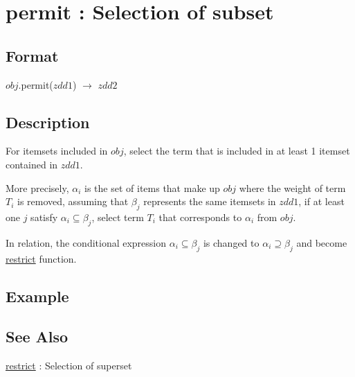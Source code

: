 
\section{permit : Selection of subset\label{sect:permit}}
\subsection*{Format}
$obj$.permit($zdd1$) $\rightarrow$ $zdd2$

\subsection*{Description}
For itemsets included in $obj$, select the term that is included in at least 1 itemset contained in $zdd1$. 

More precisely, $\alpha_i$ is the set of items that make up $obj$ where the weight of term $T_i$ is removed, 
assuming that $\beta_j$ represents the same itemsets in $zdd1$, 
if at least one $j$ satisfy $\alpha_i \subseteq \beta_j$, select term $T_i$ that corresponds to $\alpha_i$ from $obj$. 

In relation, the conditional expression $\alpha_i \subseteq \beta_j$ is changed to $\alpha_i \supseteq \beta_j$ and become \hyperref[sect:restrict]{restrict} function. 


\subsection*{Example}


\subsection*{See Also}
\hyperref[sect:restrict]{restrict} : Selection of superset
